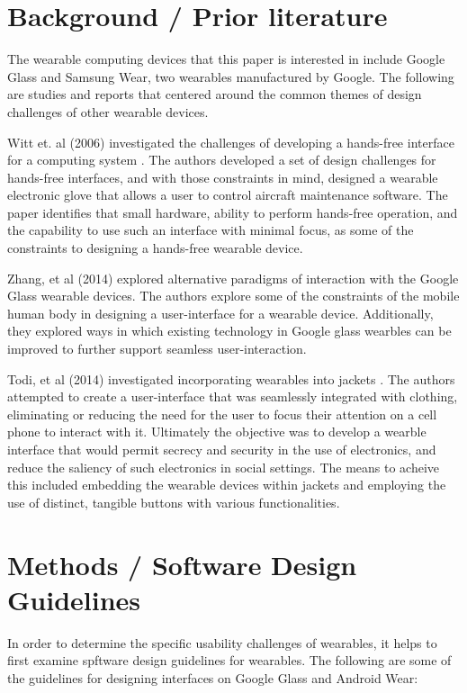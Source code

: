 \documentclass[12pt]{article}
\begin{document}
\section{Background / Prior literature}

The wearable computing devices that this paper is interested in include Google Glass and Samsung Wear, two wearables manufactured by Google. The following are studies and reports that centered around the common themes of design challenges of other wearable devices.

Witt et. al (2006) investigated the challenges of developing a hands-free interface for a computing system \cite{witt}. The authors developed a set of design challenges for hands-free interfaces, and with those constraints in mind, designed a wearable electronic glove that allows a user to control aircraft maintenance software. The paper identifies that small hardware, ability to perform hands-free operation, and the capability to use such an interface with minimal focus, as some of the constraints to designing a hands-free wearable device.

Zhang, et al (2014) explored alternative paradigms of interaction with the Google Glass wearable devices. The authors explore some of the constraints of the mobile human body in designing a user-interface for a wearable device. Additionally, they explored ways in which existing technology in Google glass wearbles can be improved to further support seamless user-interaction. 

Todi, et al (2014) investigated incorporating wearables into jackets \cite{todi}. The authors attempted to create a user-interface that was seamlessly integrated with clothing, eliminating or reducing the need for the user to focus their attention on a cell phone to interact with it. Ultimately the objective was to develop a wearble interface that would permit secrecy and security in the use of electronics, and reduce the saliency of such electronics in social settings.  The means to acheive this included embedding the wearable devices within jackets and employing the use of distinct, tangible buttons with various functionalities.

\section{Methods / Software Design Guidelines} 

In order to determine the specific usability challenges of wearables, it helps to first examine spftware design guidelines for wearables. The following are some of the guidelines for designing interfaces on Google Glass and Android Wear:
\end{document}
